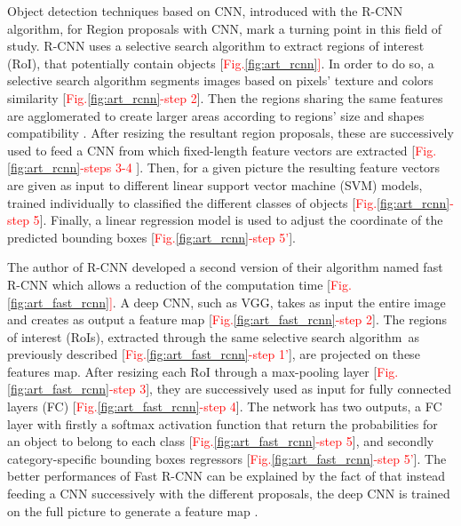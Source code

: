 \documentclass[12pt, french, a4paper]{article} %
\begin{document}
Object detection techniques based on \gls{CNN}, introduced with the \gls{R-CNN} algorithm, for Region proposals with \gls{CNN}\cite{girshick2015region}, mark a turning point in this field of study. \gls{R-CNN} uses a selective search algorithm to extract regions of interest (\gls{RoI}), that potentially contain objects [\textcolor{red}{Fig.}\ref{fig:art_rcnn}\textcolor{red}]. In order to do so, a selective search algorithm segments images based on pixels' texture and colors similarity [\textcolor{red}{Fig.}\ref{fig:art_rcnn}\textcolor{red}{-step 2}]. Then the regions sharing the same features are agglomerated to create larger areas according to regions' size and shapes compatibility \cite{uijlings2013selective}. After resizing the resultant region proposals, these are successively used to feed a \gls{CNN} from which fixed-length feature vectors are extracted [\textcolor{red}{Fig.}\ref{fig:art_rcnn}\textcolor{red}{-steps 3-4} ]. Then, for a given picture the resulting feature vectors are given as input to different linear support vector machine (SVM) models, trained individually to classified the different classes of objects [\textcolor{red}{Fig.}\ref{fig:art_rcnn}\textcolor{red}{-step 5}]. Finally, a linear regression model is used to adjust the coordinate of the predicted bounding boxes [\textcolor{red}{Fig.}\ref{fig:art_rcnn}\textcolor{red}{-step 5'}].
\par The author of \gls{R-CNN} developed a second version of their algorithm named fast \gls{R-CNN} which allows a reduction of the computation time \cite{girshick2015fast} [\textcolor{red}{Fig.}\ref{fig:art_fast_rcnn}\textcolor{red}]. A deep CNN, such as VGG, takes as input the entire image and creates as output a feature map [\textcolor{red}{Fig.}\ref{fig:art_fast_rcnn}\textcolor{red}{-step 2}]. The regions of interest (RoIs), extracted through the same selective search algorithm as previously described \cite{uijlings2013selective} [\textcolor{red}{Fig.}\ref{fig:art_fast_rcnn}\textcolor{red}{-step 1'}], are projected on these features map. After resizing each \gls{RoI} through a max-pooling layer [\textcolor{red}{Fig.}\ref{fig:art_fast_rcnn}\textcolor{red}{-step 3}], they are successively used as input for fully connected layers (\gls{FC}) [\textcolor{red}{Fig.}\ref{fig:art_fast_rcnn}\textcolor{red}{-step 4}]. The network has two outputs, a FC layer with firstly a softmax activation function that return the probabilities for an object to belong to each class [\textcolor{red}{Fig.}\ref{fig:art_fast_rcnn}\textcolor{red}{-step 5}], and secondly category-specific bounding boxes regressors [\textcolor{red}{Fig.}\ref{fig:art_fast_rcnn}\textcolor{red}{-step 5'}]. The better performances of Fast \gls{R-CNN} can be explained by the fact of that instead feeding a \gls{CNN} successively with the different proposals, the deep \gls{CNN} is trained on the full picture to generate a feature map \cite{ren2015faster}.
\end{document}
